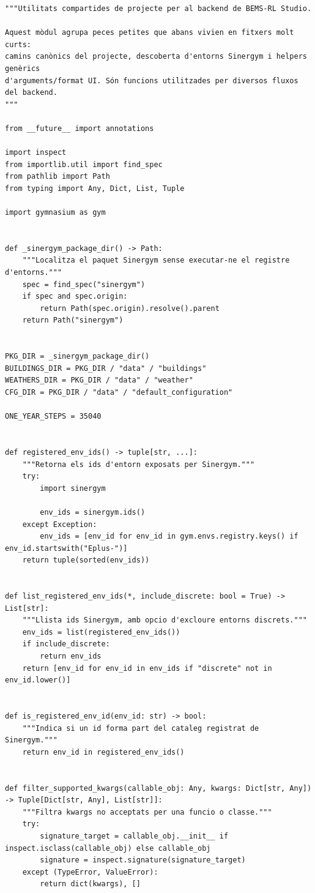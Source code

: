 \documentclass[10pt,a4paper]{article}
\begin{document}
\begin{lstlisting}[style=studioPython,caption={backend/common.py},label={lst:backend-common-py}]
"""Utilitats compartides de projecte per al backend de BEMS-RL Studio.

Aquest mòdul agrupa peces petites que abans vivien en fitxers molt curts:
camins canònics del projecte, descoberta d'entorns Sinergym i helpers genèrics
d'arguments/format UI. Són funcions utilitzades per diversos fluxos del backend.
"""

from __future__ import annotations

import inspect
from importlib.util import find_spec
from pathlib import Path
from typing import Any, Dict, List, Tuple

import gymnasium as gym


def _sinergym_package_dir() -> Path:
    """Localitza el paquet Sinergym sense executar-ne el registre d'entorns."""
    spec = find_spec("sinergym")
    if spec and spec.origin:
        return Path(spec.origin).resolve().parent
    return Path("sinergym")


PKG_DIR = _sinergym_package_dir()
BUILDINGS_DIR = PKG_DIR / "data" / "buildings"
WEATHERS_DIR = PKG_DIR / "data" / "weather"
CFG_DIR = PKG_DIR / "data" / "default_configuration"

ONE_YEAR_STEPS = 35040


def registered_env_ids() -> tuple[str, ...]:
    """Retorna els ids d'entorn exposats per Sinergym."""
    try:
        import sinergym

        env_ids = sinergym.ids()
    except Exception:
        env_ids = [env_id for env_id in gym.envs.registry.keys() if env_id.startswith("Eplus-")]
    return tuple(sorted(env_ids))


def list_registered_env_ids(*, include_discrete: bool = True) -> List[str]:
    """Llista ids Sinergym, amb opcio d'excloure entorns discrets."""
    env_ids = list(registered_env_ids())
    if include_discrete:
        return env_ids
    return [env_id for env_id in env_ids if "discrete" not in env_id.lower()]


def is_registered_env_id(env_id: str) -> bool:
    """Indica si un id forma part del cataleg registrat de Sinergym."""
    return env_id in registered_env_ids()


def filter_supported_kwargs(callable_obj: Any, kwargs: Dict[str, Any]) -> Tuple[Dict[str, Any], List[str]]:
    """Filtra kwargs no acceptats per una funcio o classe."""
    try:
        signature_target = callable_obj.__init__ if inspect.isclass(callable_obj) else callable_obj
        signature = inspect.signature(signature_target)
    except (TypeError, ValueError):
        return dict(kwargs), []


\end{lstlisting}
\end{document}
